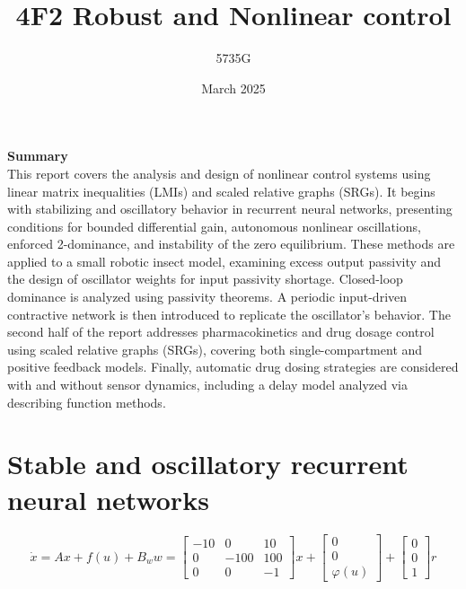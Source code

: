 \documentclass{article}
\begin{document}
\title{4F2 Robust and Nonlinear control}
\author{5735G}
\date{March 2025}
\maketitle 

\begin{center}
    \textbf{Summary} \\
    This report covers the analysis and design of nonlinear control systems using linear matrix inequalities (LMIs) and scaled relative graphs (SRGs).
    It begins with stabilizing and oscillatory behavior in recurrent neural networks, presenting conditions for bounded differential gain, autonomous nonlinear oscillations, enforced 2-dominance, and instability of the zero equilibrium.
    These methods are applied to a small robotic insect model, examining excess output passivity and the design of oscillator weights for input passivity shortage.
    Closed-loop dominance is analyzed using passivity theorems. 
    A periodic input-driven contractive network is then introduced to replicate the oscillator's behavior.
    The second half of the report addresses pharmacokinetics and drug dosage control using scaled relative graphs (SRGs), covering both single-compartment and positive feedback models.
    Finally, automatic drug dosing strategies are considered with and without sensor dynamics, including a delay model analyzed via describing function methods.
\end{center}

\section{Stable and oscillatory recurrent neural networks}

\begin{equation}
    \dot{x} = Ax + f(u) + B_w w = \begin{bmatrix}
        -10 & 0 & 10 \\
        0 & -100 & 100 \\
        0 & 0 & -1
    \end{bmatrix} x + \begin{bmatrix}
        0 \\ 0 \\ \varphi(u)
    \end{bmatrix} + \begin{bmatrix}
        0 \\ 0 \\ 1
    \end{bmatrix} r
\end{equation}
\end{document}
